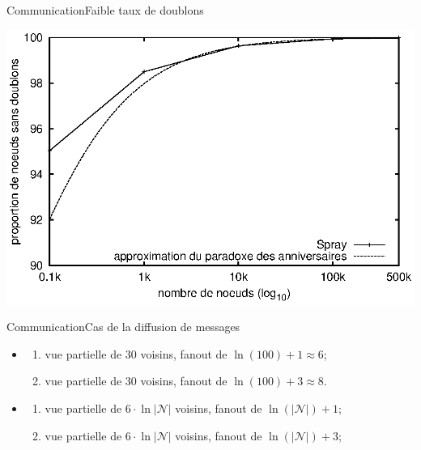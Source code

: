 \begin{frame}{Communication}{Faible taux de doublons}
  \begin{center}
    \includegraphics[width=1\textwidth]{img/network/duplicates.eps}
  \end{center}
\end{frame}


\begin{frame}{Communication}{Cas de la diffusion de messages}

  \begin{center}
    
  \end{center}
  
  \begin{center}
      
  \end{center}

  \begin{itemize}
  \item \CYCLON 
    \begin{enumerate}
    \item vue partielle de 30 voisins, fanout de $\ln(100)+1\approx 6$;
    \item vue partielle de 30 voisins, fanout de  $\ln(100)+3 \approx 8$.
    \end{enumerate}
  \item \SPRAY
    \begin{enumerate}
    \item vue partielle de $6\cdot\ln|\mathcal{N}|$ voisins,
      fanout de $\ln(|\mathcal{N}|)+1$;
    \item vue partielle de $6\cdot\ln|\mathcal{N}|$ voisins,
      fanout de $\ln(|\mathcal{N}|)+3$;
    \end{enumerate}
  \end{itemize}

\end{frame}


